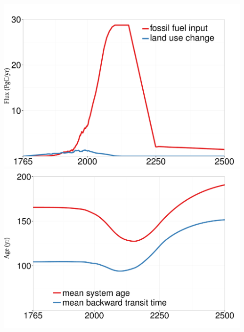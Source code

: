 \begin{columns}
	\setlength{\lc}{0.4\textwidth}
	\begin{column}{\lc}
		\begin{minipage}[t]{\textwidth}
			\includegraphics[width=0.9\lc]{images/content/ext_inp.pdf}
			\\
			\includegraphics[width=0.9\lc]{images/content/means.pdf}
		\end{minipage}
	\end{column}
	\setlength{\rc}{\the\dimexpr (\textwidth-\lc) \relax }
	\begin{column}{\rc}
		\begin{minipage}[t]{\textwidth}

\end{minipage}
\end{column}
\end{columns}
